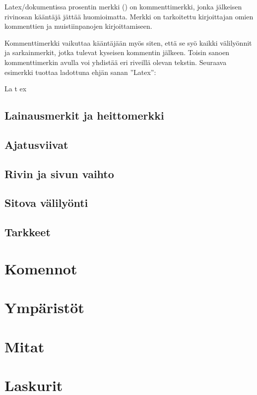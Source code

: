 Latex\-/dokumentissa prosentin merkki (\koodi{\%}) on kommenttimerkki,
jonka jälkeisen rivin\-osan kääntäjä jättää huomioimatta. Merkki on
tarkoitettu kirjoittajan omien kommenttien ja muistiinpanojen
kirjoittamiseen.

\begin{koodilohkosis}
\end{koodilohkosis}

Kommenttimerkki vaikuttaa kääntäjään myös siten, että se syö kaikki
välilyönnit ja sarkainmerkit, jotka tulevat kyseisen kommentin jälkeen.
Toisin sanoen kommenttimerkin avulla voi yhdistää eri riveillä olevan
tekstin. Seuraava esimerkki tuottaa ladottuna ehjän sanan ''Latex'':

\begin{koodilohkosis}
  La%
    t%
      ex
\end{koodilohkosis}

\subsection{Lainausmerkit ja heittomerkki}
\subsection{Ajatusviivat}
\subsection{Rivin ja sivun vaihto}
\subsection{Sitova välilyönti}
\subsection{Tarkkeet}
\label{luku:tarkkeet}
\section{Komennot}
\label{luku:komennot}
\section{Ympäristöt}
\label{luku:ymparistot}
\section{Mitat}
\section{Laskurit}
